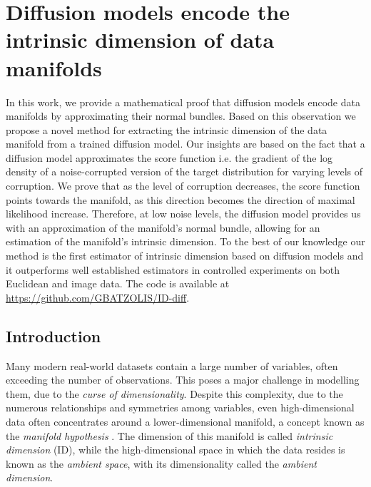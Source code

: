 \chapter{Diffusion models encode the intrinsic dimension of data manifolds}\label{Chapter:intrinsic-dimension}

\ifpdf
    \graphicspath{{Chapter3/Figs/Raster/}{Chapter3/Figs/PDF/}{Chapter3/Figs/}}
\else
    \graphicspath{{Chapter3/Figs/Vector/}{Chapter3/Figs/}}
\fi

In this work, we provide a mathematical proof that diffusion models encode data manifolds by approximating their normal bundles. Based on this observation we propose a novel method for extracting the intrinsic dimension of the data manifold from a trained diffusion model. Our insights are based  on the fact that a diffusion model approximates the score function i.e. the gradient of the log density of a noise-corrupted version of the target distribution for varying levels of corruption. We prove that as the level of corruption decreases, the score function points towards the manifold, as this direction becomes the direction of maximal likelihood increase. Therefore, at low noise levels, the diffusion model provides us with an approximation of the manifold's normal bundle, allowing for an estimation of the manifold's intrinsic dimension.  To the best of our knowledge our method is the first estimator of intrinsic dimension based on diffusion models and it outperforms well established estimators in controlled experiments on both Euclidean and image data. The code is available at \url{https://github.com/GBATZOLIS/ID-diff}.

\section{Introduction}\label{ch3:sec:introduction}

Many modern real-world datasets contain a large number of variables, often exceeding the number of observations. This poses a major challenge in modelling them, due to the \textit{curse of dimensionality}. Despite this complexity,  due to the numerous relationships and symmetries among variables, even high-dimensional data often concentrates around a lower-dimensional manifold, a concept known as the \textit{manifold hypothesis} 
\cite{manifold_hypothesis}. The dimension of this manifold is called \textit{intrinsic dimension} (ID),  while the high-dimensional space in which the data resides is known as the
\textit{ambient space}, with its dimensionality called the \textit{ambient dimension}.

